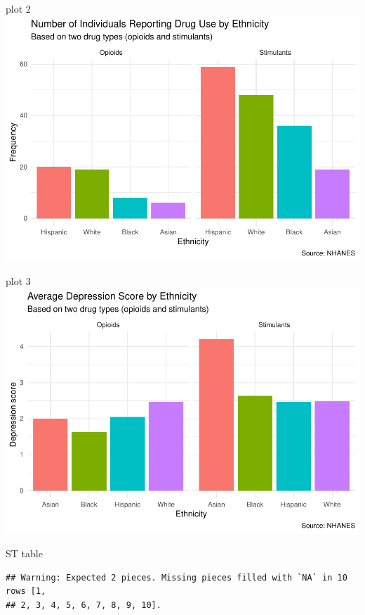 \documentclass[man]{apa6}
\begin{document}
plot 2
\includegraphics{Final_Paper_Group_3_files/figure-latex/ST_plot-1.pdf}

plot 3
\includegraphics{Final_Paper_Group_3_files/figure-latex/ST_plott-1.pdf}

ST table

\begin{verbatim}
## Warning: Expected 2 pieces. Missing pieces filled with `NA` in 10 rows [1,
## 2, 3, 4, 5, 6, 7, 8, 9, 10].
\end{verbatim}
\end{document}
